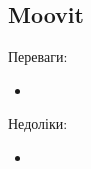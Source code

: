 \subsection{Moovit}
\label{subsec:moovit-subsection}


Переваги:
\begin{itemize}
    \item
\end{itemize}

Недоліки:
\begin{itemize}
    \item
\end{itemize}
